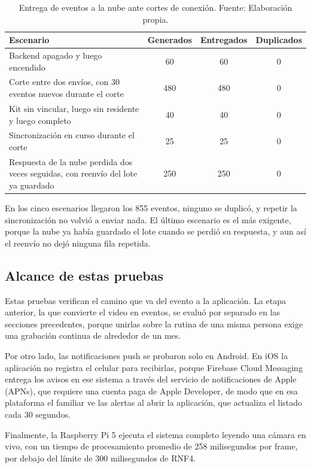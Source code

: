 \begin{table}[H]
\centering
\caption[Entrega de eventos ante cortes de conexión.]{Entrega de eventos a la nube ante cortes de conexión. Fuente: Elaboración propia.}
\label{tab:corte_reconexion}
\small
\begin{tabular}{@{}p{7.2cm}ccc@{}}
\toprule
\textbf{Escenario} & \textbf{Generados} & \textbf{Entregados} & \textbf{Duplicados} \\
\midrule
Backend apagado y luego encendido & 60 & 60 & 0 \\
Corte entre dos envíos, con 30 eventos nuevos durante el corte & 480 & 480 & 0 \\
Kit sin vincular, luego sin residente y luego completo & 40 & 40 & 0 \\
Sincronización en curso durante el corte & 25 & 25 & 0 \\
Respuesta de la nube perdida dos veces seguidas, con reenvío del lote ya guardado & 250 & 250 & 0 \\
\bottomrule
\end{tabular}
\end{table}

En los cinco escenarios llegaron los 855 eventos, ninguno se duplicó, y repetir la sincronización no volvió a enviar nada.
El último escenario es el más exigente, porque la nube ya había guardado el lote cuando se perdió su respuesta, y aun así el reenvío no dejó ninguna fila repetida.

\subsection{Alcance de estas pruebas}

Estas pruebas verifican el camino que va del evento a la aplicación.
La etapa anterior, la que convierte el video en eventos, se evaluó por separado en las secciones precedentes, porque unirlas sobre la rutina de una misma persona exige una grabación continua de alrededor de un mes.

Por otro lado, las notificaciones push se probaron solo en Android.
En iOS la aplicación no registra el celular para recibirlas, porque Firebase Cloud Messaging entrega los avisos en ese sistema a través del servicio de notificaciones de Apple (APNs), que requiere una cuenta paga de Apple Developer, de modo que en esa plataforma el familiar ve las alertas al abrir la aplicación, que actualiza el listado cada 30 segundos.

Finalmente, la Raspberry Pi 5 ejecuta el sistema completo leyendo una cámara en vivo, con un tiempo de procesamiento promedio de 258 milisegundos por frame, por debajo del límite de 300 milisegundos de RNF4.

